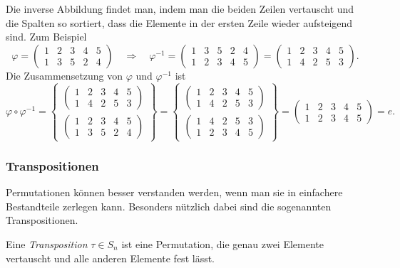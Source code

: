 Die inverse Abbildung findet man, indem man die beiden Zeilen vertauscht
und die Spalten so sortiert, dass die Elemente in der ersten Zeile
wieder aufsteigend sind.
Zum Beispiel
\[
\varphi
=
\begin{pmatrix}
1&2&3&4&5\\
1&3&5&2&4
\end{pmatrix}
\quad\Rightarrow\quad
\varphi^{-1}
=
\begin{pmatrix}
1&3&5&2&4\\
1&2&3&4&5
\end{pmatrix}
=
\begin{pmatrix}
1&2&3&4&5\\
1&4&2&5&3
\end{pmatrix}.
\]
Die Zusammensetzung von $\varphi$ und $\varphi^{-1}$ ist
\[
\varphi\circ\varphi^{-1}
=
\left\{
\begin{array}{c}
\displaystyle
\begin{pmatrix}
1&2&3&4&5\\
1&4&2&5&3
\end{pmatrix}
\\
\displaystyle
\begin{pmatrix}
1&2&3&4&5\\
1&3&5&2&4
\end{pmatrix}
\end{array}
\right\}
=
\left\{
\begin{array}{c}
\displaystyle
\begin{pmatrix}
1&2&3&4&5\\
1&4&2&5&3
\end{pmatrix}
\\
\displaystyle
\begin{pmatrix}
1&4&2&5&3\\
1&2&3&4&5
\end{pmatrix}
\end{array}
\right\}
=
\begin{pmatrix}
1&2&3&4&5\\
1&2&3&4&5
\end{pmatrix}
=
e.
\]

%
%
\subsubsection{Transpositionen}
Permutationen können besser verstanden werden, wenn man sie in einfachere 
Bestandteile zerlegen kann.
Besonders nützlich dabei sind die sogenannten Transpositionen.

\begin{definition}[Transposition]
Eine {\em Transposition} $\tau\in S_n$ ist eine Permutation, die genau
zwei Elemente vertauscht und alle anderen Elemente fest lässt.
%
\end{definition}

